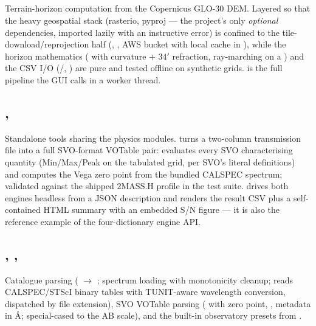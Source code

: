\subsection{}
Terrain-horizon computation from the Copernicus GLO-30 DEM. Layered so
that the heavy geospatial stack (rasterio, pyproj --- the project's only
\emph{optional} dependencies, imported lazily with an instructive error)
is confined to the tile-download/reprojection half
(, , AWS bucket with
local cache in ), while the horizon mathematics
( with curvature + $34'$ refraction,
 ray-marching on a
) and the CSV I/O
(/,
) are pure and tested offline on synthetic grids.
 is the full pipeline the GUI calls in a worker
thread.

\subsection{, }
Standalone tools sharing the physics modules. 
turns a two-column transmission file into a full SVO-format VOTable pair:
 evaluates every SVO characterising
quantity (Min/Max/Peak on the tabulated grid, per SVO's literal
definitions) and  computes the Vega
zero point from the bundled CALSPEC spectrum; validated against the
shipped 2MASS.H profile in the test suite. 
drives both engines headless from a JSON description and renders the
result CSV plus a self-contained HTML summary with an embedded S/N figure
--- it is also the reference example of the four-dictionary engine API.

\subsection{, ,
}
Catalogue parsing ( $\to$ ;
spectrum loading with monotonicity cleanup; 
reads CALSPEC/STScI binary tables with TUNIT-aware wavelength conversion,
dispatched by file extension), SVO VOTable parsing
( with zero point, , metadata in
\AA{};  special-cased to the AB scale), and the built-in
observatory presets from .

